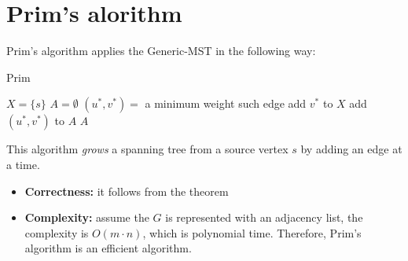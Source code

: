 \section{Prim's alorithm}
Prim's algorithm applies the Generic-MST in the following way:\newpage
\begin{algorithm}
\caption{Prim}\label{Prim}
    \begin{algorithmic}[1]
        \State $X = \{s\}$
        \State $A = \emptyset$
            \State $(u^{*}, v^{*})=$ a minimum weight such edge
            \State add $v^{*}$ to $X$
            \State add $(u^{*}, v^{*})$ to $A$
        \EndWhile
        \Return $A$
    \EndProcedure
    \end{algorithmic}
\end{algorithm}
This algorithm \textit{grows} a spanning tree from a source vertex $s$ by adding an edge at a time.
\begin{itemize}
    \item \textbf{Correctness:} it follows from the theorem
    \item \textbf{Complexity:} assume the $G$ is represented with an adjacency list, the complexity is $O(m \cdot n)$, which is polynomial time. Therefore, Prim's algorithm is an efficient algorithm.
\end{itemize}
